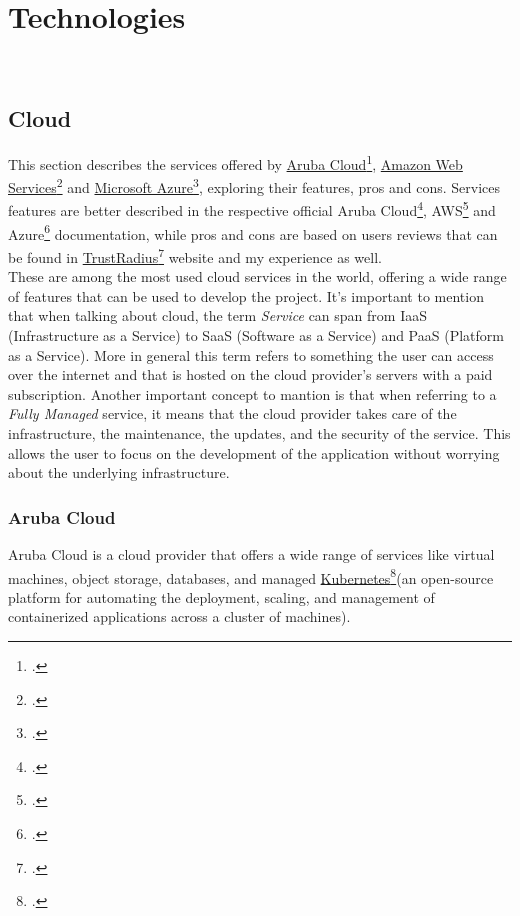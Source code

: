 \chapter{Technologies}
\label{cap:technologies}

\\

\section{Cloud}
\label{cloud}
This section describes the services offered by \href{https://www.arubacloud.com/}{Aruba Cloud}\footcite{site:aruba-cloud}, \href{https://aws.amazon.com/it/}{Amazon Web Services}\footcite{site:aws} and \href{https://azure.microsoft.com/it-it/}{Microsoft Azure}\footcite{site:azure}, exploring their features, pros and cons. 
Services features are better described in the respective official Aruba Cloud\footcite{site:aruba-docs}, AWS\footcite{site:aws-docs} and Azure\footcite{site:azure-docs} documentation, 
while pros and cons are based on users reviews that can be found in 
\href{https://www.trustradius.com/}{TrustRadius}\footcite{site:trust-radius} website and my experience as well.\\
These are among the most used cloud services in the world, offering a wide range of features that can be used to develop the project. It's important to mention that when talking about cloud, the term \textit{Service} can span from IaaS (Infrastructure as a Service) to SaaS (Software as a Service) and PaaS (Platform as a Service). More in general this term refers to something the user can access over the internet and that is hosted on the cloud provider's servers with a paid subscription. Another important concept to mantion is that when referring to a \textit{Fully Managed} service, it means that the cloud provider takes care of the infrastructure, the maintenance, the updates, and the security of the service. This allows the user to focus on the development of the application without worrying about the underlying infrastructure.\\


    \subsection{Aruba Cloud}
    \label{aruba-cloud}
 Aruba Cloud is a cloud provider that offers a wide range of services like virtual machines, object storage, databases, and managed \href{https://kubernetes.io/}{Kubernetes}\footcite{site:kubernetes}(an open-source platform for automating the deployment, scaling, and management of containerized applications across a cluster of machines).\\


